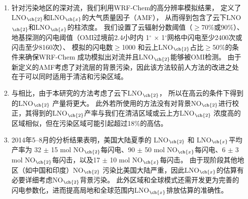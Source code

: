 \begin{enumerate}[label=（\arabic*）, labelindent=\parindent, nosep, leftmargin=0pt, widest=0, itemindent=*, topsep=0pt, partopsep=0pt, parsep=0pt]

\item 针对污染地区的深对流，我们利用WRF-Chem的高分辨率模拟结果，
定义了LNO$_{\ch{2}}$和LNO$_{\ch{x}}$的大气质量因子（AMF），
从而得到包含了云下LNO$_{\ch{2}}$和LNO$_{\ch{x}}$的柱浓度。
我们设置了云辐射分数阈值（$\geq$70\%或90\%）、
地基探测的闪电阈值（OMI过境前2.4小时内 1$^{\circ}$ $\times$ 1$^{\circ}$网格中闪电至少2400次或闪击至少8160次）、
模拟的闪电数$\geq$1000 和云上LNO$_{\ch{2}}$占比$\geq$50\%的条件来确保WRF-Chem 成功模拟出对流并且LNO$_{\ch{2}}$能够被OMI检测。
由于新定义的AMF考虑了对流层的背景污染，因此该方法较前人方法的改进之处在于可以同时适用于清洁和污染区域。

\item 与\citet{Lapierre.2020}相比，由于本研究的方法考虑了云下LNO$_{\ch{2}}$，
所以在高云的条件下得到的LNO$_{\ch{2}}$ 产量将更大。
此外若\citet{Pickering.2016}所使用的方法没有对背景NO$_{\ch{2}}$进行校正，其得到的LNO$_{\ch{2}}$产率与我们在清洁区域或云上方LNO$_{\ch{2}}$ 浓度高的区域相似，但在污染区域可能引起超过18\%的高估。

\item 2014年5--8月的分析结果表明，美国大陆夏季的 LNO$_{\ch{2}}$ 和 LNO$_{\ch{x}}$平均产率为
32 $\pm$ 15 mol NO$_{\ch{2}}$每闪电、90 $\pm$ 50 mol NO$_{\ch{x}}$每闪电、6 $\pm$ 3 mol NO$_{\ch{2}}$每闪击，以及17 $\pm$ 10 mol NO$_{\ch{x}}$每闪击。
由于现阶段其他地区（如中国和印度）NO$_{\ch{2}}$ 污染比美国大陆严重，因此LNO$_{\ch{x}}$的估算有必要详细考虑NO$_{\ch{2}}$背景污染。
此外区域和全球模式还需开发更为完善的闪电参数化，进而提高局地和全球范围内LNO$_{\ch{x}}$排放估算的准确性。

\end{enumerate}
